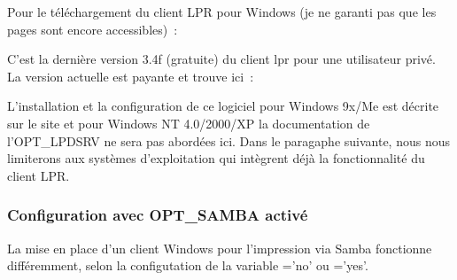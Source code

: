 \begin{enumerate}
    Pour le téléchargement du client LPR pour Windows (je ne garanti pas que
    les pages sont encore accessibles)~:\\

    C'est la dernière version 3.4f (gratuite) du client lpr pour une utilisateur
    privé. La version actuelle est payante et trouve ici~:


    L'installation et la configuration de ce logiciel pour Windows 9x/Me est
    décrite sur le site et pour Windows NT 4.0/2000/XP la documentation de
    l'OPT\_LPDSRV ne sera pas abordées ici.
    Dans le paragaphe suivante, nous nous limiterons aux systèmes d'exploitation
    qui intègrent déjà la fonctionnalité du client LPR.

\end{enumerate}


\subsubsection{Configuration avec OPT\_SAMBA activé}

    La mise en place d'un client Windows pour l'impression via Samba fonctionne
    différemment, selon la configutation de la variable ='no'
    ou ='yes'.

